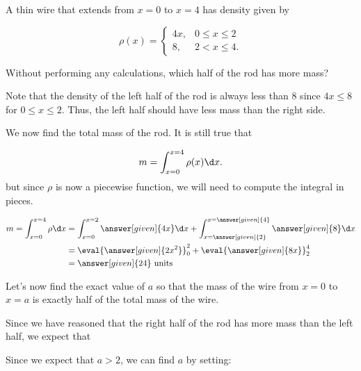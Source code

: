 \documentclass{ximera}
\begin{document}
\begin{example}
A thin wire that extends from $x=0$ to $x=4$ has density given by

\[ \rho(x) = \left\{ 
\begin{array}{cl}
4x, & 0 \leq x\leq 2 \\
8 ,& 2 < x \leq 4.
\end{array} \right.
\]

Without performing any calculations, which half of the rod has more mass?

\begin{multipleChoice}
\end{multipleChoice}

\begin{explanation}
Note that the density of the left half of the rod is always less than 8 since $4x \leq 8$ for $0\leq x \leq 2$.  Thus, the left half should have less mass than the right side.


We now find the total mass of the rod.  It is still true that

\[
m = \int_{x=0}^{x=4} \rho(x) \d x.
\]
but since $\rho$ is now a piecewise function, we will need to compute the integral in pieces.  

\begin{align*}
m = \int_{x=0}^{x=4} \rho \d x & = \int_{x=0}^{x=2} \answer[given]{4x} \d x + \int_{x=\answer[given]{2}}^{x=\answer[given]{4}} \answer[given]{8} \d x \\
&= \eval{\answer[given]{2x^2}}_0^2+\eval{\answer[given]{8x}}_2^4 \\
&= \answer[given]{24} \textrm{ units}
\end{align*}
\end{explanation}

Let's now find the exact value of $a$ so that the mass of the wire from $x=0$ to $x=a$ is exactly half of the total mass of the wire. 

\begin{explanation}
Since we have reasoned that the right half of the rod has more mass than the left half, we expect that

\begin{multipleChoice}
\end{multipleChoice}
 
 Since we expect that $a>2$, we can find $a$ by setting:
 

\end{explanation}
\end{example}
\end{document}

